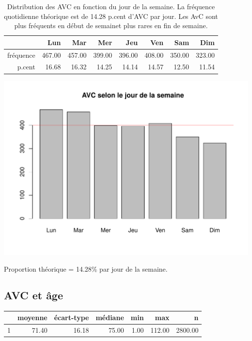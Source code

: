 \documentclass[12pt,english,french,twoside]{book}\usepackage[]{graphicx}\usepackage[]{color}
\makeatletter
\def\maxwidth{ %
  \ifdim\Gin@nat@width>\linewidth
    \linewidth
  \else
    \Gin@nat@width
  \fi
}
\makeatother
\begin{document}

\begin{table}[ht]
\centering
\begin{tabular}{rrrrrrrr}
  \hline
 & Lun & Mar & Mer & Jeu & Ven & Sam & Dim \\ 
  \hline
fréquence & 467.00 & 457.00 & 399.00 & 396.00 & 408.00 & 350.00 & 323.00 \\ 
  p.cent & 16.68 & 16.32 & 14.25 & 14.14 & 14.57 & 12.50 & 11.54 \\ 
   \hline
\end{tabular}
\caption[AVC selon le jour de la semaine]{Distribution des AVC en fonction du jour de la semaine. La fréquence quotidienne théorique est de 14.28 p.cent d'AVC par jour. Les AvC sont plus fréquents en début de semainet plus rares en fin de semaine.} 
\label{tab:avc_jour}
\end{table}

\includegraphics[width=\maxwidth]{figure/avc_jour_semaine-1} 

Proportion théorique = 14.28\% par jour de la semaine.

\subsection*{AVC et âge}

\begin{table}[ht]
\centering
\begin{tabular}{rrrrrrr}
  \hline
 & moyenne & écart-type & médiane & min & max & n \\ 
  \hline
1 & 71.40 & 16.18 & 75.00 & 1.00 & 112.00 & 2800.00 \\ 
   \hline
\end{tabular}
\end{table}
\end{document}
